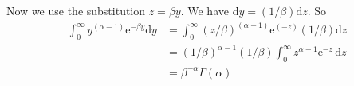 \documentclass[12pt]{article}
\begin{document}
\begin{enumerate}
                                Now we use the substitution $z = \beta y$. We have  $\mathrm{d}y = (1/\beta) \mathrm{d}z$. So
                                \begin{align*}     
                                    \int_0^\infty y^{(\alpha - 1)} \mathrm{e}^{-\beta y} \mathrm{d}y &=  \int_0^\infty (z/\beta)^{(\alpha - 1)}  \mathrm{e}^{(-z)} (1/\beta)  \mathrm{d}z    \\
                                  &= (1/\beta)^{\alpha - 1} (1/\beta) \int_0^\infty   z^{\alpha - 1}\mathrm{e}^{-z}\,\mathrm{d}z \\
                                  &= \beta^{-\alpha} \Gamma(\alpha)     
                                \end{align*}

         
\end{enumerate}
\end{document}
